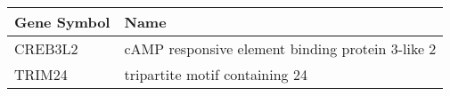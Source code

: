 \begin{tabular}{ll}
\toprule
Gene Symbol &                                             Name \\
\midrule
    CREB3L2 & cAMP responsive element binding protein 3-like 2 \\
     TRIM24 &                   tripartite motif containing 24 \\
\bottomrule
\end{tabular}
